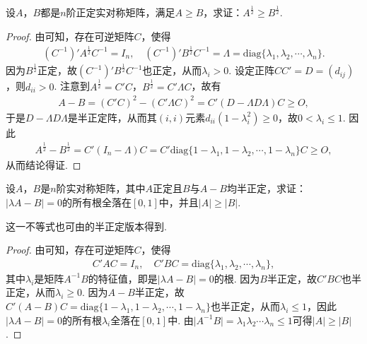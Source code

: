 \documentclass[../../main.tex]{subfiles}
\begin{document}
\begin{example}\label{example:例9.79}
设\(A\)，\(B\)都是\(n\)阶正定实对称矩阵，满足\(A\geq B\)，求证：\(A^{\frac{1}{2}}\geq B^{\frac{1}{2}}\).
\end{example}
\begin{proof}
由可知，存在可逆矩阵\(C\)，使得
\begin{align*}
(C^{-1})'A^{\frac{1}{2}}C^{-1} = I_n,\quad (C^{-1})'B^{\frac{1}{2}}C^{-1} = \Lambda = \mathrm{diag}\{\lambda_1,\lambda_2,\cdots,\lambda_n\}.
\end{align*}
因为\(B^{\frac{1}{2}}\)正定，故\((C^{-1})'B^{\frac{1}{2}}C^{-1}\)也正定，从而\(\lambda_i>0\). 设定正阵\(CC' = D=(d_{ij})\)，则\(d_{ii}>0\). 注意到\(A^{\frac{1}{2}} = C'C\)，\(B^{\frac{1}{2}} = C'\Lambda C\)，故有
\begin{align*}
A - B=(C'C)^2-(C'\Lambda C)^2 = C'(D - \Lambda D\Lambda)C\geq O,
\end{align*}
于是\(D - \Lambda D\Lambda\)是半正定阵，从而其\((i,i)\)元素\(d_{ii}(1 - \lambda_i^2)\geq0\)，故\(0<\lambda_i\leq1\). 因此
\begin{align*}
A^{\frac{1}{2}} - B^{\frac{1}{2}} = C'(I_n - \Lambda)C = C'\mathrm{diag}\{1 - \lambda_1,1 - \lambda_2,\cdots,1 - \lambda_n\}C\geq O,
\end{align*}
从而结论得证.
\end{proof}

\begin{example}\label{example:例9.80}
设\(A\)，\(B\)是\(n\)阶实对称矩阵，其中\(A\)正定且\(B\)与\(A - B\)均半正定，求证：\(\vert\lambda A - B\vert = 0\)的所有根全落在\([0,1]\)中，并且\(\vert A\vert\geq\vert B\vert\).
\end{example}
\begin{remark}
这一不等式也可由的半正定版本得到.
\end{remark}
\begin{proof}
由可知，存在可逆矩阵\(C\)，使得
\begin{align*}
C'AC = I_n,\quad C'BC = \mathrm{diag}\{\lambda_1,\lambda_2,\cdots,\lambda_n\},
\end{align*}
其中\(\lambda_i\)是矩阵\(A^{-1}B\)的特征值，即是\(\vert\lambda A - B\vert = 0\)的根. 因为\(B\)半正定，故\(C'BC\)也半正定，从而\(\lambda_i\geq0\). 因为\(A - B\)半正定，故\(C'(A - B)C = \mathrm{diag}\{1 - \lambda_1,1 - \lambda_2,\cdots,1 - \lambda_n\}\)也半正定，从而\(\lambda_i\leq1\)，因此\(\vert\lambda A - B\vert = 0\)的所有根\(\lambda_i\)全落在\([0,1]\)中. 由\(\vert A^{-1}B\vert=\lambda_1\lambda_2\cdots\lambda_n\leq1\)可得\(\vert A\vert\geq\vert B\vert\). 
\end{proof}
\end{document}
